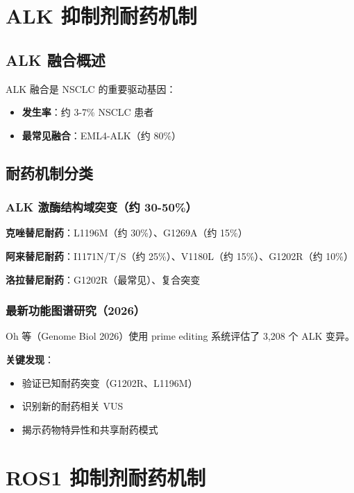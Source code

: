 \documentclass[12pt,a4paper]{article}
\begin{document}
\section{ALK 抑制剂耐药机制}

\subsection{ALK 融合概述}

ALK 融合是 NSCLC 的重要驱动基因：
\begin{itemize}
    \item \textbf{发生率}：约 3-7\% NSCLC 患者
    \item \textbf{最常见融合}：EML4-ALK（约 80\%）
\end{itemize}

\subsection{耐药机制分类}

\subsubsection{ALK 激酶结构域突变（约 30-50\%）}

\textbf{克唑替尼耐药}：L1196M（约 30\%）、G1269A（约 15\%）

\textbf{阿来替尼耐药}：I1171N/T/S（约 25\%）、V1180L（约 15\%）、G1202R（约 10\%）

\textbf{洛拉替尼耐药}：G1202R（最常见）、复合突变

\subsubsection{最新功能图谱研究（2026）}

Oh 等（Genome Biol 2026）使用 prime editing 系统评估了 3,208 个 ALK 变异。

\textbf{关键发现}：
\begin{itemize}
    \item 验证已知耐药突变（G1202R、L1196M）
    \item 识别新的耐药相关 VUS
    \item 揭示药物特异性和共享耐药模式
\end{itemize}

\section{ROS1 抑制剂耐药机制}
\end{document}
